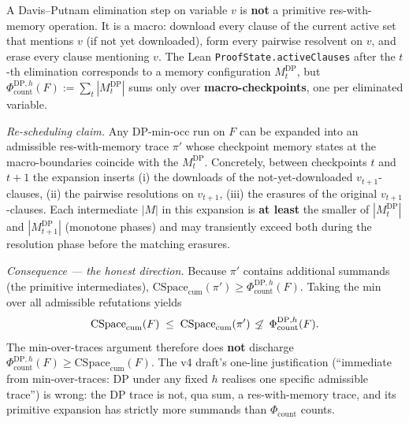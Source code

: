 \documentclass[11pt,a4paper]{article}
\theoremstyle{remark}
\begin{document}
A Davis--Putnam elimination step on variable $v$ is \textbf{not} a
primitive res-with-memory operation. It is a macro: download every clause
of the current active set that mentions $v$ (if not yet downloaded), form
every pairwise resolvent on $v$, and erase every clause mentioning $v$.
The Lean \texttt{ProofState.activeClauses} after the $t$-th elimination
corresponds to a memory configuration $M_t^{\mathrm{DP}}$, but
$\Phi_{\mathrm{count}}^{\mathrm{DP},h}(F) := \sum_t |M_t^{\mathrm{DP}}|$
sums only over \textbf{macro-checkpoints}, one per eliminated variable.

\textit{Re-scheduling claim.} Any DP-min-occ run on $F$ can be expanded
into an admissible res-with-memory trace $\pi'$ whose checkpoint memory
states at the macro-boundaries coincide with the $M_t^{\mathrm{DP}}$.
Concretely, between checkpoints $t$ and $t+1$ the expansion inserts
(i) the downloads of the not-yet-downloaded $v_{t+1}$-clauses,
(ii) the pairwise resolutions on $v_{t+1}$,
(iii) the erasures of the original $v_{t+1}$-clauses. Each intermediate
$|M|$ in this expansion is \textbf{at least} the smaller of
$|M_t^{\mathrm{DP}}|$ and $|M_{t+1}^{\mathrm{DP}}|$ (monotone phases) and
may transiently exceed both during the resolution phase before the
matching erasures.

\textit{Consequence --- the honest direction.} Because $\pi'$ contains
additional summands (the primitive intermediates),
$\mathrm{CSpace}_{\mathrm{cum}}(\pi') \ge
\Phi_{\mathrm{count}}^{\mathrm{DP},h}(F)$. Taking the min over all
admissible refutations yields
\[
\mathrm{CSpace}_{\mathrm{cum}}(F) \;\le\;
\mathrm{CSpace}_{\mathrm{cum}}(\pi') \;\not\!\le\;
\Phi_{\mathrm{count}}^{\mathrm{DP},h}(F).
\]
The min-over-traces argument therefore does \textbf{not} discharge
$\Phi_{\mathrm{count}}^{\mathrm{DP},h}(F) \ge
\mathrm{CSpace}_{\mathrm{cum}}(F)$. The v4 draft's one-line justification
(``immediate from min-over-traces: DP under any fixed $h$ realises one
specific admissible trace'') is wrong: the DP trace is not, qua sum, a
res-with-memory trace, and its primitive expansion has strictly more
summands than $\Phi_{\mathrm{count}}$ counts.\endgroup
\end{document}
